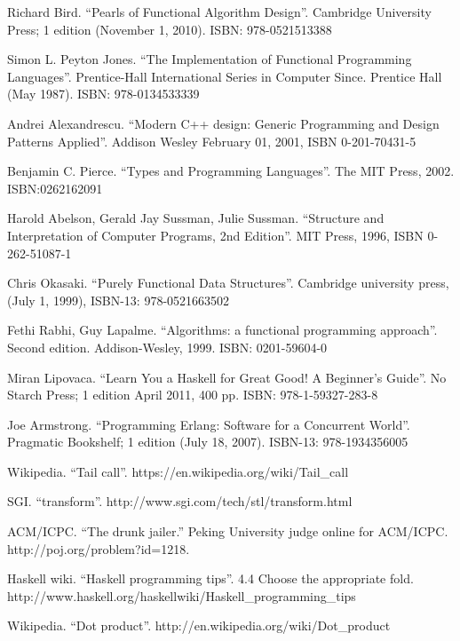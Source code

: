 \documentclass[UTF8]{article}
\begin{document}
\begin{thebibliography}{99}

Richard Bird. ``Pearls of Functional Algorithm Design''. Cambridge University Press; 1 edition (November 1, 2010). ISBN: 978-0521513388

Simon L. Peyton Jones. ``The Implementation of Functional Programming Languages''. Prentice-Hall International Series in Computer Since. Prentice Hall (May 1987). ISBN: 978-0134533339

Andrei Alexandrescu. ``Modern C++ design: Generic Programming and Design Patterns Applied''. Addison Wesley February 01, 2001, ISBN 0-201-70431-5

Benjamin C. Pierce. ``Types and Programming Languages''. The MIT Press, 2002. ISBN:0262162091

Harold Abelson, Gerald Jay Sussman, Julie Sussman. ``Structure and Interpretation of Computer Programs, 2nd Edition''. MIT Press, 1996, ISBN 0-262-51087-1

Chris Okasaki. ``Purely Functional Data Structures''. Cambridge university press, (July 1, 1999), ISBN-13: 978-0521663502

Fethi Rabhi, Guy Lapalme. ``Algorithms: a functional programming approach''. Second edition. Addison-Wesley, 1999. ISBN: 0201-59604-0

Miran Lipovaca. ``Learn You a Haskell for Great Good! A Beginner's Guide''. No Starch Press; 1 edition April 2011, 400 pp. ISBN: 978-1-59327-283-8

Joe Armstrong. ``Programming Erlang: Software for a Concurrent World''. Pragmatic Bookshelf; 1 edition (July 18, 2007). ISBN-13: 978-1934356005

Wikipedia. ``Tail call''. https://en.wikipedia.org/wiki/Tail\_call

SGI. ``transform''. http://www.sgi.com/tech/stl/transform.html

ACM/ICPC. ``The drunk jailer.'' Peking University judge online for ACM/ICPC. http://poj.org/problem?id=1218.

Haskell wiki. ``Haskell programming tips''. 4.4 Choose the appropriate fold. http://www.haskell.org/haskellwiki/Haskell\_programming\_tips

Wikipedia. ``Dot product''. http://en.wikipedia.org/wiki/Dot\_product

\end{thebibliography}

\ifx\wholebook\relax \else
\end{document}
